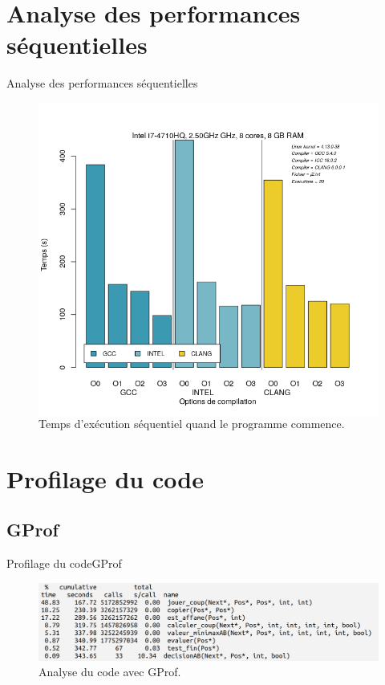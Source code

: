 \documentclass{beamer}
\begin{document}
\section{Analyse des performances séquentielles}

\begin{frame}{Analyse des performances séquentielles}

\begin{figure}
	\begin{columns}
      \caption{Temps d’exécution séquentiel quand le programme commence.}
      \label{fig:exec_seq}
      \includegraphics[width=\textwidth]{GCCvsICCvsCLANG_j2.png}
    \end{columns}
\end{figure}
\end{frame}

\section{Profilage du code}

\subsection{GProf}
\begin{frame}{Profilage du code}{GProf}
\begin{figure}
        \includegraphics[width=\textwidth]{gprof.png}
        \caption{Analyse du code avec GProf.\label{Fig:GProf}}
\end{figure}
\end{frame}
\end{document}
